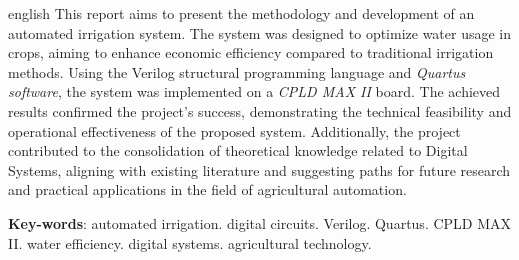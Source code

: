 \documentclass[
	article,			%
	11pt,				%
	oneside,			%
	a4paper,			%
	english,			%
	brazil,				%
	sumario=tradicional
	]{abntex2}
\begin{document}



\postextual



\emptythanks
\maketitle

\renewcommand{\resumoname}{Abstract}
\begin{resumoumacoluna}
 \begin{otherlanguage*}{english}
   This report aims to present the methodology and development of an automated irrigation system. The system was designed to optimize water usage in crops, aiming to enhance economic efficiency compared to traditional irrigation methods. Using the Verilog structural programming language and \textit{Quartus software}, the system was implemented on a \textit{CPLD MAX II} board. The achieved results confirmed the project's success, demonstrating the technical feasibility and operational effectiveness of the proposed system. Additionally, the project contributed to the consolidation of theoretical knowledge related to Digital Systems, aligning with existing literature and suggesting paths for future research and practical applications in the field of agricultural automation.

   \vspace{\onelineskip}
 
   \noindent
   \textbf{Key-words}: automated irrigation. digital circuits. Verilog. Quartus. CPLD MAX II. water efficiency. digital systems. agricultural technology.






 \end{otherlanguage*}  
\end{resumoumacoluna}



\end{document}
